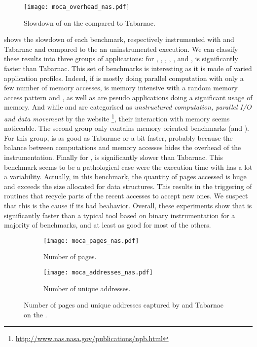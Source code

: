 \begin{figure}[htb]
    \centering
    \texttt{[image: moca\_overhead\_nas.pdf]}
    \caption{Slowdown of \Moca on the \NPB compared to
    Tabarnac.}
    \label{fig:ovh}
\end{figure}

 shows the slowdown of each benchmark, respectively instrumented with \Moca and Tabarnac and compared to the
an uninstrumented execution. We can classify these results into three groups of
applications:  for \BT, \DC, \EP, \IS, \LU, \SP and \UA, \Moca is
significantly faster than Tabarnac. This set of benchmarks is interesting as it is made of varied application profiles.
Indeed, if \EP is mostly doing parallel computation with only a few number of
memory accesses, \IS is memory intensive with a random memory access pattern and
\BT, \LU as well as \SP are pseudo applications doing a significant usage of memory.
And while \DC and \UA are categorised as \emph{unstructured computation,
parallel I/O and data movement} by the \NPB website
\footnote{\url{http://www.nas.nasa.gov/publications/npb.html}}, their interaction with memory seems noticeable.
The second group only contains memory oriented benchmarks (\CG and \FT). For this group,
\Moca is as good as Tabarnac or a bit faster, probably because the balance between computations and memory accesses hides the overhead of the instrumentation.
Finally for \MG, \Moca is
significantly slower than Tabarnac. This benchmark seems to be a pathological
case were the execution time with \Moca has a lot a variability. Actually, in this benchmark, the quantity of pages accessed is huge and exceeds the size
allocated for \Moca data structures. This results in the triggering of \Moca routines that recycle parts of the recent accesses to accept new ones.
We suspect that this is the cause if its bad beahavior.
Overall, these experiments show that \Moca is significantly faster than a typical tool based on binary instrumentation
for a majority of benchmarks, and at least as good for most of the others.

\begin{figure}[htb]
    \centering
    \begin{subfigure}{\linewidth}
        \texttt{[image: moca\_pages\_nas.pdf]}
        \caption{Number of pages.}
        \label{fig:pages}
    \end{subfigure}
    \begin{subfigure}{\linewidth}
        \texttt{[image: moca\_addresses\_nas.pdf]}
        \caption{Number of unique addresses.}
        \label{fig:addr}
    \end{subfigure}
    \caption{Number of pages and unique addresses captured by \Moca and Tabarnac
    on the \NPB.}
    \label{fig:pages-addr}
\end{figure}

